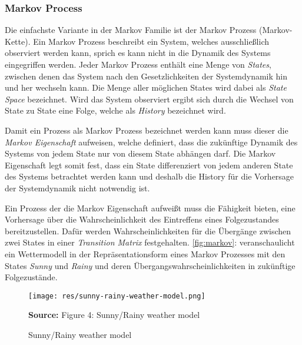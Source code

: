 \documentclass[11pt]{scrartcl}
\newcommand{\source}[1]{\vspace{-5pt} \caption*{\hfill \textbf{Source:} {#1}} }
\begin{document}
\subsubsection{Markov Process}
Die einfachste Variante in der Markov Familie ist der Markov Prozess (Markov-Kette). Ein Markov Prozess
beschreibt ein System, welches ausschließlich observiert werden kann, sprich es kann nicht in die Dynamik
des Systems eingegriffen werden. Jeder Markov Prozess enthält eine Menge von \textit{States}, zwischen
denen das System nach den Gesetzlichkeiten der Systemdynamik hin und her wechseln kann. Die Menge aller
möglichen States wird dabei als \textit{State Space} bezeichnet. Wird das System observiert ergibt sich
durch die Wechsel von State zu State eine Folge, welche als \textit{History} bezeichnet wird. 

Damit ein Prozess als Markov Prozess bezeichnet werden kann muss dieser die \textit{Markov Eigenschaft}
aufweisen, welche definiert, dass die zukünftige Dynamik des Systems von jedem State nur von diesem State abhängen darf. Die Markov Eigenschaft legt somit fest, dass ein State differenziert von jedem anderen State 
des Systems betrachtet werden kann und deshalb die History für die Vorhersage der Systemdynamik nicht
notwendig ist.

Ein Prozess der die Markov Eigenschaft aufweißt muss die Fähigkeit bieten, eine Vorhersage über
die Wahrscheinlichkeit des Eintreffens eines Folgezustandes bereitzustellen. Dafür werden 
Wahrscheinlichkeiten für die Übergänge zwischen zwei States in einer \textit{Transition Matrix}
festgehalten. \autoref{fig:markov}:  veranschaulicht ein Wettermodell in 
der Repräsentationsform eines Markov Prozesses mit den States \textit{Sunny} und \textit{Rainy}
und deren Übergangswahrscheinlichkeiten in zukünftige Folgezustände.

\begin{figure}[htp]
\centering
\texttt{[image: res/sunny-rainy-weather-model.png]}
\caption{Sunny/Rainy weather model}
\source{Figure 4: Sunny/Rainy weather model \cite[~S.13]{L2018}}
\label{fig:markov}
\end{figure}
\end{document}

